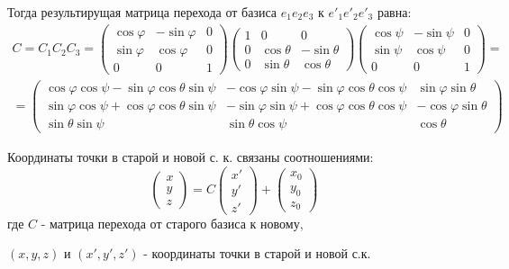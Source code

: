 Тогда результирущая матрица перехода от базиса $e_1 e_2 e_3$ к $e'_1 e'_2 e'_3$ равна:
$$\begin{gathered}
	C = C_1 C_2 C_3 = \begin{pmatrix}
		\cos \varphi & -\sin \varphi & 0 \\
		\sin \varphi & \cos \varphi & 0 \\
		0 & 0 & 1
	\end{pmatrix} 
	\begin{pmatrix}
		1 & 0 & 0 \\
		0 &\cos \theta & -\sin \theta\\
		0 & \sin \theta & \cos \theta
	\end{pmatrix}
	\begin{pmatrix}
		\cos \psi & -\sin \psi & 0 \\
		\sin \psi & \cos \psi & 0 \\
		0 & 0 & 1
	\end{pmatrix} = \\
	= \begin{pmatrix}
		\cos \varphi \cos \psi - \sin \varphi \cos \theta \sin \psi    &    - \cos \varphi \sin \psi - \sin \varphi \cos \theta \cos \psi    &     \sin \varphi \sin \theta \\
		\sin \varphi \cos \psi + \cos \varphi \cos \theta \sin \psi    &    - \sin \varphi \sin \psi + \cos \varphi \cos \theta \cos \psi    &     -\cos \varphi \sin \theta \\
		\sin \theta \sin \psi & \sin \theta \cos \psi & \cos \theta  
	\end{pmatrix}
\end{gathered}$$

Координаты точки в старой и новой с. к. связаны соотношениями:
$$\begin{pmatrix}
	x \\ y \\ z
\end{pmatrix} = C \begin{pmatrix}
	x' \\ y' \\ z'
\end{pmatrix} + \begin{pmatrix}
	x_0 \\ y_0 \\ z_0
\end{pmatrix}$$
где $C$ - матрица перехода от старого базиса к новому,

\hspace{0.4cm}$(x,y,z)$ и $(x', y', z')$ - координаты точки в старой и новой с.к.


